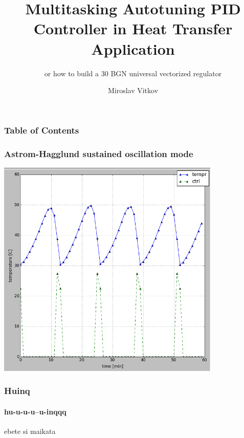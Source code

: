 \documentclass{beamer}
\title{Multitasking Autotuning PID Controller in Heat Transfer Application}
\subtitle{or how to build a 30 BGN universal vectorized regulator}
\author{Miroslav Vitkov}
\institute{ELDE, Technical University-Sofia}
\begin{document}
\frame{\titlepage}

\begin{frame}
\frametitle{Table of Contents}
\tableofcontents
\end{frame}

\begin{frame}
\frametitle{Astrom-Hagglund sustained oscillation mode}
\includegraphics[width=0.8\textwidth]{../images/exp_relay_slow.png}~
\end{frame}


\begin{frame}  %
\frametitle{Huinq}
\framesubtitle{hu-u-u-u--u-inqqq}
ebete si maikata
\end{frame}
\end{document}

